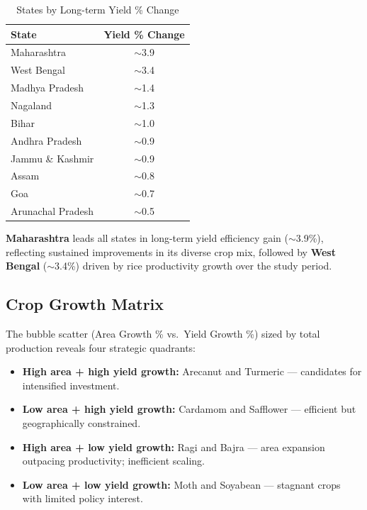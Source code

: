 \documentclass[10pt]{article}
\begin{document}
\begin{table}[H]
  \centering
  \caption{States by Long-term Yield \% Change}
  \label{tab:staterank}
  \small
  \begin{tabular}{lc}
    \toprule
    \textbf{State} & \textbf{Yield \% Change} \\
    \midrule
    Maharashtra          & $\sim$3.9 \\
    West Bengal          & $\sim$3.4 \\
    Madhya Pradesh       & $\sim$1.4 \\
    Nagaland             & $\sim$1.3 \\
    Bihar                & $\sim$1.0 \\
    Andhra Pradesh       & $\sim$0.9 \\
    Jammu \& Kashmir     & $\sim$0.9 \\
    Assam                & $\sim$0.8 \\
    Goa                  & $\sim$0.7 \\
    Arunachal Pradesh    & $\sim$0.5 \\
    \bottomrule
  \end{tabular}
\end{table}

\textbf{Maharashtra} leads all states in long-term yield efficiency gain
($\sim$3.9\%), reflecting sustained improvements in its diverse crop mix,
followed by \textbf{West Bengal} ($\sim$3.4\%) driven by rice productivity
growth over the study period.

\subsection{Crop Growth Matrix}
The bubble scatter (Area Growth \% vs.\ Yield Growth \%) sized by total
production reveals four strategic quadrants:
\begin{itemize}[leftmargin=*, topsep=2pt, itemsep=1pt]
  \item \textbf{High area + high yield growth:} Arecanut and Turmeric —
        candidates for intensified investment.
  \item \textbf{Low area + high yield growth:} Cardamom and Safflower —
        efficient but geographically constrained.
  \item \textbf{High area + low yield growth:} Ragi and Bajra — area
        expansion outpacing productivity; inefficient scaling.
  \item \textbf{Low area + low yield growth:} Moth and Soyabean —
        stagnant crops with limited policy interest.
\end{itemize}
\end{document}
